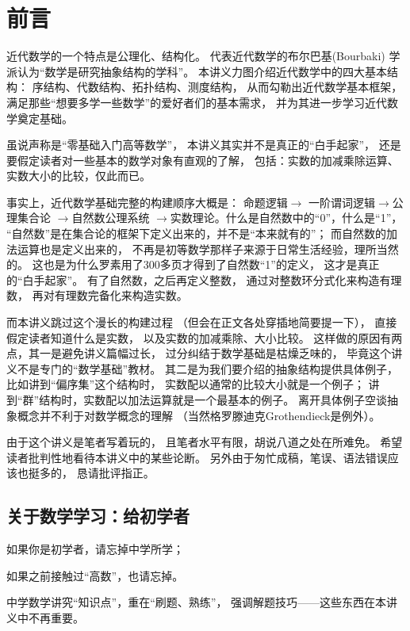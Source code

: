 \chapter*{前言}

近代数学的一个特点是公理化、结构化。
代表近代数学的布尔巴基(Bourbaki)
学派认为“数学是研究抽象结构的学科”。
本讲义力图介绍近代数学中的四大基本结构：
序结构、代数结构、拓扑结构、测度结构，
从而勾勒出近代数学基本框架，
满足那些“想要多学一些数学”的爱好者们的基本需求，
并为其进一步学习近代数学奠定基础。

虽说声称是“零基础入门高等数学”，
本讲义其实并不是真正的“白手起家”，
还是要假定读者对一些基本的数学对象有直观的了解，
包括：实数的加减乘除运算、实数大小的比较，仅此而已。

事实上，近代数学基础完整的构建顺序大概是：
命题逻辑$\rightarrow$
一阶谓词逻辑$\rightarrow$公理集合论
$\rightarrow$自然数公理系统
$\rightarrow$实数理论。什么是自然数中的“0”，什么是“1”，
“自然数”是在集合论的框架下定义出来的，并不是“本来就有的”；
而自然数的加法运算也是定义出来的，
不再是初等数学那样子来源于日常生活经验，理所当然的。
这也是为什么罗素用了300多页才得到了自然数“1”的定义，
这才是真正的“白手起家”。
有了自然数，之后再定义整数，
通过对整数环分式化来构造有理数，
再对有理数完备化来构造实数。

而本讲义跳过这个漫长的构建过程
（但会在正文各处穿插地简要提一下），
直接假定读者知道什么是实数，
以及实数的加减乘除、大小比较。
这样做的原因有两点，其一是避免讲义篇幅过长，
过分纠结于数学基础是枯燥乏味的，
毕竟这个讲义不是专门的“数学基础”教材。
其二是为我们要介绍的抽象结构提供具体例子，
比如讲到“偏序集”这个结构时，
实数配以通常的比较大小就是一个例子；
讲到“群”结构时，实数配以加法运算就是一个最基本的例子。
离开具体例子空谈抽象概念并不利于对数学概念的理解
（当然格罗滕迪克Grothendieck是例外）。

由于这个讲义是笔者写着玩的，
且笔者水平有限，胡说八道之处在所难免。
希望读者批判性地看待本讲义中的某些论断。
另外由于匆忙成稿，笔误、语法错误应该也挺多的，
恳请批评指正。

\section*{关于数学学习：给初学者}

如果你是初学者，请忘掉中学所学；

如果之前接触过“高数”，也请忘掉。

中学数学讲究“知识点”，重在“刷题、熟练”，
强调解题技巧——这些东西在本讲义中不再重要。

